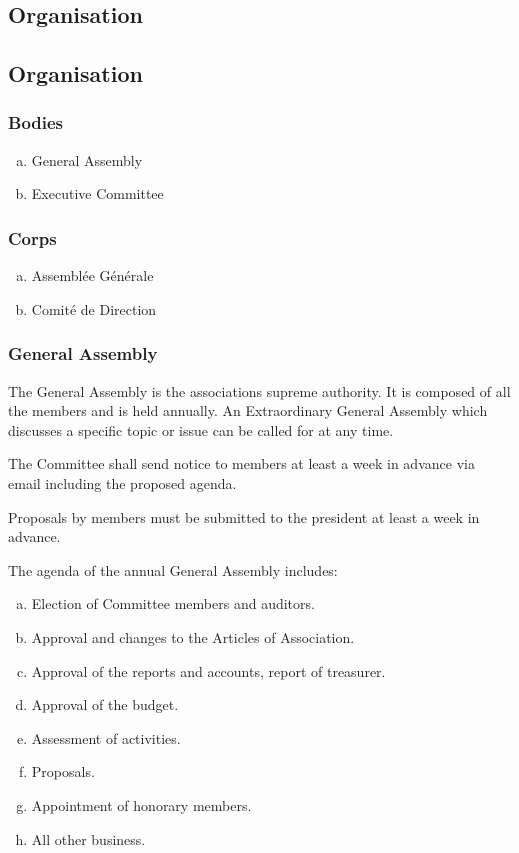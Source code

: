\documentclass[12pt,a4paper,oneside]{article}
\newcounter{art}
\newcommand{\english}{    \switchcolumn[0]\noindent}
\newcommand{\french}{    \switchcolumn[1]\noindent}
\begin{document}
\begin{paracol}{2}


\english
	\subsection{Organisation}

\french
	\subsection{Organisation}

	\english
	\subsubsection{Bodies}

	\begin{enumerate}[(a)]
	\item General Assembly
	\item Executive Committee
	\end{enumerate}

\french
	\subsubsection{Corps}

	\begin{enumerate}[(a)]
	\item Assemblée Générale
	\item Comité de Direction
	\end{enumerate}

	\english
	\subsubsection{General Assembly}
	The General Assembly is the associations supreme authority. It is composed of all the members and is held annually. An Extraordinary General Assembly which discusses a specific topic or issue can be called for at any time.

	The Committee shall send notice to members at least a week in advance via email including the proposed agenda.

	Proposals by members must be submitted to the president at least a week in advance.

	The agenda of the annual General Assembly includes:
	\begin{enumerate}[(a)]
	\item Election of Committee members and auditors.
	\item Approval and changes to the Articles of Association.
	\item Approval of the reports and accounts, report of treasurer.
	\item Approval of the budget.
	\item Assessment of activities.
	\item Proposals.
	\item Appointment of honorary members.
	\item All other business.
	\end{enumerate}


\end{paracol}
\end{document}
